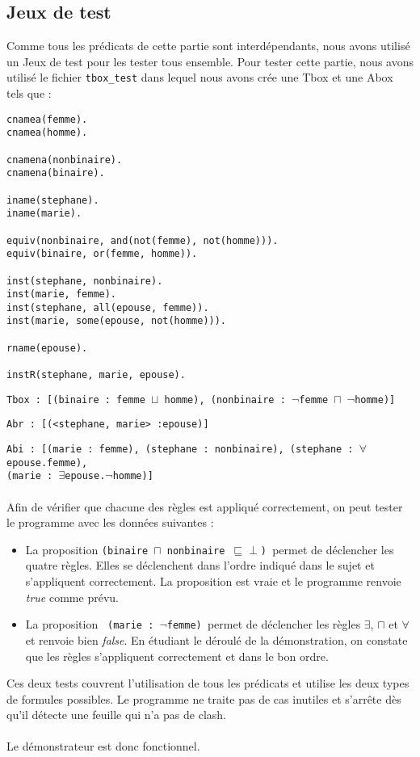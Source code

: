 \documentclass{article}
\newcommand{\code}[1]{\colorbox{light-gray}{\texttt{#1}}}
\begin{document}
\subsection{Jeux de test}

Comme tous les prédicats de cette partie sont interdépendants, nous avons utilisé un Jeux de test pour les tester tous ensemble. Pour tester cette partie, nous avons utilisé le fichier \code{tbox\_test} dans lequel nous avons crée une Tbox et une Abox tels que :

\begin{verbatim}
cnamea(femme).
cnamea(homme).

cnamena(nonbinaire).
cnamena(binaire).

iname(stephane).
iname(marie).

equiv(nonbinaire, and(not(femme), not(homme))).
equiv(binaire, or(femme, homme)).

inst(stephane, nonbinaire).
inst(marie, femme).
inst(stephane, all(epouse, femme)).
inst(marie, some(epouse, not(homme))).

rname(epouse).

instR(stephane, marie, epouse).
\end{verbatim}

\code{Tbox : [(binaire : femme $\sqcup$ homme), (nonbinaire : $\lnot$femme  $\sqcap$ $\lnot$homme)]}

\code{Abr : [(<stephane, marie> :epouse)]}

\code{Abi : [(marie : femme), (stephane : nonbinaire), (stephane : $\forall$epouse.femme), }\\\code{(marie : $\exists$epouse.$\lnot$homme)]}
\\\\

Afin de vérifier que chacune des règles est appliqué correctement, on peut tester le programme avec les données suivantes :
\begin{itemize}
    \item 
La proposition \code{(binaire $\sqcap$ nonbinaire $\sqsubseteq \perp$) }permet de déclencher les quatre règles. Elles se déclenchent dans l'ordre indiqué dans le sujet et s'appliquent correctement. La proposition est vraie et le programme renvoie \textit{true} comme prévu.
 \item La proposition \code{ (marie : $\lnot$femme) }permet de déclencher les règles $\exists$, $\sqcap$ et $\forall$ et renvoie bien \textit{false}.
En étudiant le déroulé de la démonstration, on constate que les règles s'appliquent correctement et dans le bon ordre.
\end{itemize}

Ces deux tests couvrent l'utilisation de tous les prédicats et utilise les deux types de formules possibles. Le programme ne traite pas de cas inutiles et s'arrête dès qu'il détecte une feuille qui n'a pas de clash. 
\\\\
Le démonstrateur est donc fonctionnel.
\end{document}
